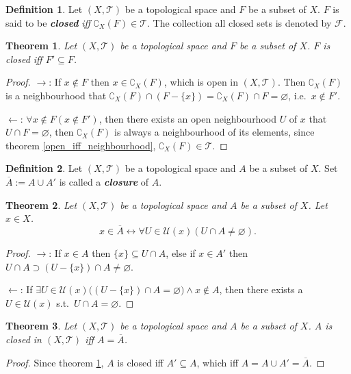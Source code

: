 \documentclass{article}%
\theoremstyle{plain}
\newtheorem{theorem}{Theorem}[section] %
\theoremstyle{definition}
\newtheorem{definition}{Definition}[section] %
\newcommand*{\indexbf}[1]{\textit{\textbf{#1}}\index{#1}}
\begin{document}
\begin{definition}\label{closed_set}
Let $(X,\mathscr T)$ be a topological space and $F$ be a subset of $X$. $F$ is said to be \indexbf{closed} \emph{iff} $\complement_X (F) \in \mathscr T$. The collection all closed sets is denoted by $\mathscr F$.
\end{definition}

\begin{theorem}\label{closed_iff_accumulation}
Let $(X,\mathscr T)$ be a topological space and $F$ be a subset of $X$. $F$ is closed \emph{iff} $ F'  \subseteq F$.
\end{theorem}
\begin{proof}
$\to$: 
If $x\notin F$ then $x\in \complement_X (F)$, which is open in $(X,\mathscr T)$. 
Then $\complement_X (F)$ is a neighbourhood that $\complement_X (F) \cap (F-\{x\}) = \complement_X (F) \cap F =\varnothing$, i.e.\ $x\notin F'$.

$\leftarrow$:
$\forall x\notin F(x\notin F')$, then there exists an open neighbourhood $U$ of $x$ that $U\cap F = \varnothing$, then $\complement_X (F)$ is always a neighbourhood of its elements, since theorem \ref{open_iff_neighbourhood}, $\complement_X (F) \in \mathscr T$.
\end{proof}

\begin{definition}\label{closure}
Let $(X,\mathscr T)$ be a topological space and $A$ be a subset of $X$. Set $\overline A := A\cup A'$ is called a \indexbf{closure} of $A$.
\end{definition}

\begin{theorem}\label{closure_neighbourhood}
Let $(X,\mathscr T)$ be a topological space and $A$ be a subset of $X$. Let $x\in X$.
\[
	x\in \overline A \leftrightarrow
		\forall U\in\mathscr U(x)(
			U\cap A\neq \varnothing).
\]
\end{theorem}
\begin{proof}
$\to$: If $x\in A$ then $\{x\}\subseteq U\cap A$, 
else if $x\in A'$ then $U\cap A \supset (U-\{x\})\cap A \neq \varnothing$.

$\leftarrow$: 
If $\exists U\in\mathscr U(x)\big(
	(U-\{x\})\cap A= \varnothing\big)\wedge x\notin A$, 
then there exists a $U\in \mathscr U(x)$ s.t.\ $U\cap A=\varnothing$. 
\end{proof}


\begin{theorem}\label{closed_iff_closure}
Let $(X,\mathscr T)$ be a topological space and $A$ be a subset of $X$. 
$A$ is closed in $(X,\mathscr T)$ \emph{iff} $A=\overline A$.
\end{theorem}
\begin{proof}
Since theorem \ref{closed_iff_accumulation}, $A$ is closed iff $A'\subseteq A$, which iff $A = A\cup A' = \overline A$.
\end{proof}
\end{document}
